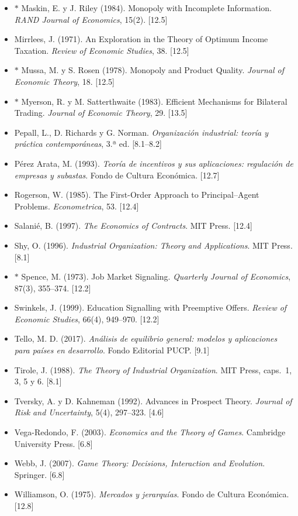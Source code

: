 \documentclass[11pt,a4paper]{article}
\begin{document}
{\begin{itemize}[leftmargin=1.4em,itemsep=1pt,label={}]
\item $\ast$ Maskin, E. y J. Riley (1984). Monopoly with Incomplete Information. \emph{RAND Journal of Economics}, 15(2). [12.5]
\item Mirrlees, J. (1971). An Exploration in the Theory of Optimum Income Taxation. \emph{Review of Economic Studies}, 38. [12.5]
\item $\ast$ Mussa, M. y S. Rosen (1978). Monopoly and Product Quality. \emph{Journal of Economic Theory}, 18. [12.5]
\item $\ast$ Myerson, R. y M. Satterthwaite (1983). Efficient Mechanisms for Bilateral Trading. \emph{Journal of Economic Theory}, 29. [13.5]
\item Pepall, L., D. Richards y G. Norman. \emph{Organización industrial: teoría y práctica contemporáneas}, 3.ª ed. [8.1--8.2]
\item Pérez Arata, M. (1993). \emph{Teoría de incentivos y sus aplicaciones: regulación de empresas y subastas}. Fondo de Cultura Económica. [12.7]
\item Rogerson, W. (1985). The First-Order Approach to Principal--Agent Problems. \emph{Econometrica}, 53. [12.4]
\item Salanié, B. (1997). \emph{The Economics of Contracts}. MIT Press. [12.4]
\item Shy, O. (1996). \emph{Industrial Organization: Theory and Applications}. MIT Press. [8.1]
\item $\ast$ Spence, M. (1973). Job Market Signaling. \emph{Quarterly Journal of Economics}, 87(3), 355--374. [12.2]
\item Swinkels, J. (1999). Education Signalling with Preemptive Offers. \emph{Review of Economic Studies}, 66(4), 949--970. [12.2]
\item Tello, M. D. (2017). \emph{Análisis de equilibrio general: modelos y aplicaciones para países en desarrollo}. Fondo Editorial PUCP. [9.1]
\item Tirole, J. (1988). \emph{The Theory of Industrial Organization}. MIT Press, caps.~1, 3, 5 y 6. [8.1]
\item Tversky, A. y D. Kahneman (1992). Advances in Prospect Theory. \emph{Journal of Risk and Uncertainty}, 5(4), 297--323. [4.6]
\item Vega-Redondo, F. (2003). \emph{Economics and the Theory of Games}. Cambridge University Press. [6.8]
\item Webb, J. (2007). \emph{Game Theory: Decisions, Interaction and Evolution}. Springer. [6.8]
\item Williamson, O. (1975). \emph{Mercados y jerarquías}. Fondo de Cultura Económica. [12.8]
\end{itemize}
}
\end{document}

